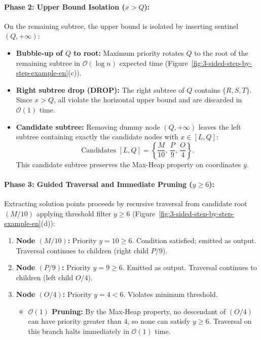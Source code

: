 \paragraph{Phase 2: Upper Bound Isolation ($x > Q$):}
On the remaining subtree, the upper bound is isolated by inserting sentinel $(Q, +\infty)$:
\begin{itemize}
    \item \textbf{Bubble-up of $Q$ to root:} Maximum priority rotates $Q$ to the root of the remaining subtree in $\mathcal{O}(\log n)$ expected time (Figure~\ref{fig:3-sided-step-by-step-example-en}(c)).
    \item \textbf{Right subtree drop (DROP):} The right subtree of $Q$ contains $\{R, S, T\}$. Since $x > Q$, all violate the horizontal upper bound and are discarded in $\mathcal{O}(1)$ time.
    \item \textbf{Candidate subtree:} Removing dummy node $(Q, +\infty)$ leaves the left subtree containing exactly the candidate nodes with $x \in [L, Q]$:
    \begin{equation}
      \text{Candidates } [L, Q] = \left\{ \frac{M}{10}, \, \frac{P}{9}, \, \frac{O}{4} \right\}.
    \end{equation}
    This candidate subtree preserves the Max-Heap property on coordinates $y$.
\end{itemize}

\paragraph{Phase 3: Guided Traversal and Immediate Pruning ($y \ge 6$):}
Extracting solution points proceeds by recursive traversal from candidate root $(M / 10)$ applying threshold filter $y \ge 6$ (Figure~\ref{fig:3-sided-step-by-step-example-en}(d)):
\begin{enumerate}
    \item \textbf{Node $(M / 10)$:} Priority $y = 10 \ge 6$. Condition satisfied; emitted as output. Traversal continues to children (right child $P / 9$).
    \item \textbf{Node $(P / 9)$:} Priority $y = 9 \ge 6$. Emitted as output. Traversal continues to children (left child $O / 4$).
    \item \textbf{Node $(O / 4)$:} Priority $y = 4 < 6$. Violates minimum threshold.
    \begin{itemize}
        \item \textbf{$\mathcal{O}(1)$ Pruning:} By the Max-Heap property, no descendant of $(O / 4)$ can have priority greater than $4$, so none can satisfy $y \ge 6$. Traversal on this branch halts immediately in $\mathcal{O}(1)$ time.
    \end{itemize}
\end{enumerate}

